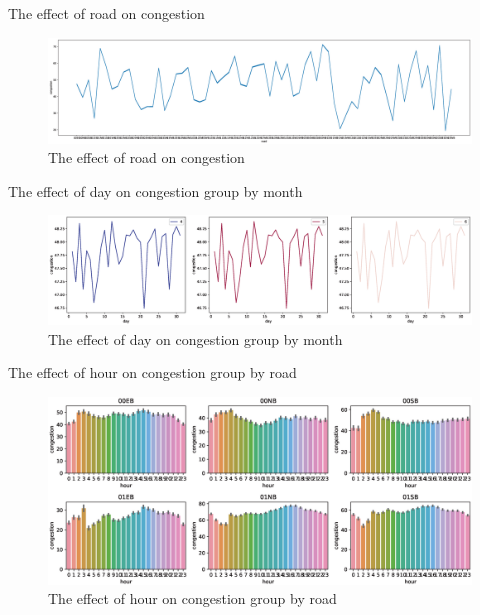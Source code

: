 \documentclass[
 size=14pt,
 paper=smartboard,  %
 mode=present, 		%
 display=slides, 	%
 style=tuliplab,  	%
 pauseslide,
 fleqn,leqno]{powerdot}
\begin{document}
\begin{slide}[toc=,bm=]{The effect of road on congestion }
	\begin{center}
		\begin{figure}
			\setlength{\abovecaptionskip}{0.4cm} 
			\raggedleft
			\includegraphics[scale=0.32]{figure/road1.eps}
			\centering
			\caption{The effect of road on congestion}
			\label{road}
		\end{figure}
	\end{center}
	\end{slide}
\begin{slide}[toc=,bm=]{The effect of day on congestion group by month }
\begin{center}
	\begin{figure}
		\setlength{\abovecaptionskip}{0.5cm} 
		\raggedleft
		\includegraphics[scale=0.4]{figure/day.eps}
		\centering
		\caption{The effect of day on congestion group by month}
		\label{day}
	\end{figure}
\end{center}
\end{slide}
\begin{slide}[toc=,bm=]{The effect of hour on congestion group by road }
	\begin{figure}
		\setlength{\abovecaptionskip}{0.4cm} 
		\raggedleft
		\includegraphics[scale=0.65]{figure/road.eps}
		\centering
		\caption{The effect of hour on congestion group by road}
		\label{group by road}
	\end{figure}
\end{slide}
\end{document}

